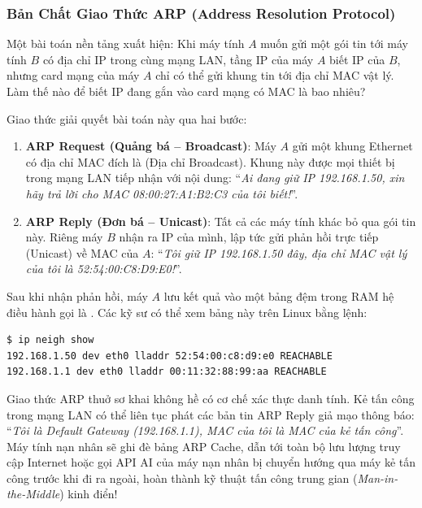 \subsubsection{Bản Chất Giao Thức ARP (Address Resolution Protocol)}
Một bài toán nền tảng xuất hiện: Khi máy tính $A$ muốn gửi một gói tin tới máy tính $B$ có địa chỉ IP  trong cùng mạng LAN, tầng IP của máy $A$ biết IP của $B$, nhưng card mạng của máy $A$ chỉ có thể gửi khung tin tới địa chỉ MAC vật lý. Làm thế nào để biết IP  đang gắn vào card mạng có MAC là bao nhiêu?

Giao thức  giải quyết bài toán này qua hai bước:
\begin{enumerate}
  \item \textbf{ARP Request (Quảng bá -- Broadcast)}: Máy $A$ gửi một khung Ethernet có địa chỉ MAC đích là  (Địa chỉ Broadcast). Khung này được mọi thiết bị trong mạng LAN tiếp nhận với nội dung: ``\textit{Ai đang giữ IP 192.168.1.50, xin hãy trả lời cho MAC 08:00:27:A1:B2:C3 của tôi biết!}''.
  \item \textbf{ARP Reply (Đơn bá -- Unicast)}: Tất cả các máy tính khác bỏ qua gói tin này. Riêng máy $B$ nhận ra IP của mình, lập tức gửi phản hồi trực tiếp (Unicast) về MAC của $A$: ``\textit{Tôi giữ IP 192.168.1.50 đây, địa chỉ MAC vật lý của tôi là 52:54:00:C8:D9:E0!}''.
\end{enumerate}

Sau khi nhận phản hồi, máy $A$ lưu kết quả vào một bảng đệm trong RAM hệ điều hành gọi là . Các kỹ sư có thể xem bảng này trên Linux bằng lệnh:
\begin{lstlisting}[language=bash]
$ ip neigh show
192.168.1.50 dev eth0 lladdr 52:54:00:c8:d9:e0 REACHABLE
192.168.1.1 dev eth0 lladdr 00:11:32:88:99:aa REACHABLE
\end{lstlisting}

\begin{securitybox}
Giao thức ARP thuở sơ khai không hề có cơ chế xác thực danh tính. Kẻ tấn công trong mạng LAN có thể liên tục phát các bản tin ARP Reply giả mạo thông báo: ``\textit{Tôi là Default Gateway (192.168.1.1), MAC của tôi là MAC của kẻ tấn công}''. Máy tính nạn nhân sẽ ghi đè bảng ARP Cache, dẫn tới toàn bộ lưu lượng truy cập Internet hoặc gọi API AI của máy nạn nhân bị chuyển hướng qua máy kẻ tấn công trước khi đi ra ngoài, hoàn thành kỹ thuật tấn công trung gian (\textit{Man-in-the-Middle}) kinh điển!
\end{securitybox}

